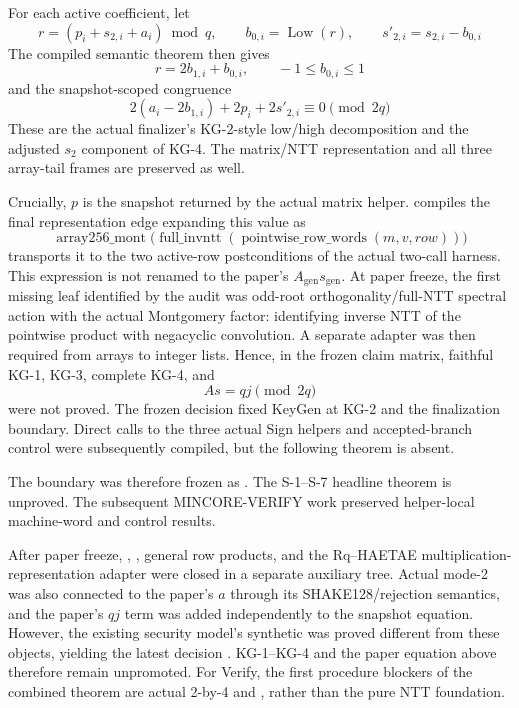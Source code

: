 For each active coefficient, let
\[
  r=(p_i+s_{2,i}+a_i)\bmod q,\qquad
  b_{0,i}=\operatorname{Low}(r),\qquad
  s'_{2,i}=s_{2,i}-b_{0,i}
\]
The compiled semantic theorem then gives
\[
  r=2b_{1,i}+b_{0,i},\qquad -1\le b_{0,i}\le1
\]
and the snapshot-scoped congruence
\[
  2(a_i-2b_{1,i})+2p_i+2s'_{2,i}\equiv0\pmod{2q}
\]
These are the actual finalizer's KG-2-style low/high decomposition and the
adjusted \(s_2\) component of KG-4. The matrix/NTT representation and all three
array-tail frames are preserved as well.

Crucially, \(p\) is the 
snapshot returned by the actual matrix helper.
 compiles the final representation
edge expanding this value as
\[
 \operatorname{array256\_mont}
 \bigl(\operatorname{full\_invntt}
   (\operatorname{pointwise\_row\_words}(m,v,row))\bigr)
\]
 transports it to the
two active-row postconditions of the actual two-call harness. This expression
is not renamed to the paper's \(A_{\mathrm{gen}}s_{\mathrm{gen}}\). At paper
freeze, the first missing leaf identified by the audit was odd-root
orthogonality/full-NTT spectral action with the actual Montgomery factor:
identifying inverse NTT of the pointwise product with 
negacyclic convolution. A separate adapter was then required from
 arrays to  integer
lists. Hence, in the frozen claim matrix, faithful KG-1, KG-3, complete KG-4, and
\[
  A s=qj\pmod{2q}
\]
were not proved. The frozen  decision fixed KeyGen
at KG-2 and the finalization boundary. Direct calls to the three actual Sign
helpers and accepted-branch control were subsequently compiled, but the following theorem is absent.
\begin{center}
  \small{}
\end{center}
The boundary was therefore frozen as .
The S-1--S-7 headline theorem is unproved. The subsequent MINCORE-VERIFY work
preserved helper-local machine-word and control results.

After paper freeze, ,
\allowbreak{},
general row products, and the Rq--HAETAE multiplication-representation
adapter were closed in a separate auxiliary tree. Actual mode-2
 was also connected to the paper's \(a\) through its
SHAKE128/rejection semantics, and the paper's \(qj\) term was added
independently to the snapshot equation. However, the existing security model's
synthetic  was proved different from these
objects, yielding the latest decision . KG-1--KG-4
and the paper equation above therefore remain unpromoted. For Verify, the
first procedure blockers of the combined theorem are actual 2-by-4
 and
, rather than the pure NTT foundation.

